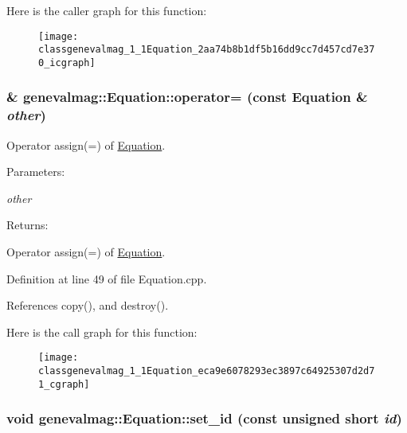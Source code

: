 Here is the caller graph for this function:\nopagebreak
\begin{figure}[H]
\begin{center}
\leavevmode
\texttt{[image: classgenevalmag\_1\_1Equation\_2aa74b8b1df5b16dd9cc7d457cd7e370\_icgraph]}
\end{center}
\end{figure}
\hypertarget{classgenevalmag_1_1Equation_eca9e6078293ec3897c64925307d2d71}{
\subsubsection[{operator=}]{ \& genevalmag::Equation::operator= (const {\bf Equation} \& {\em other})}}
\label{classgenevalmag_1_1Equation_eca9e6078293ec3897c64925307d2d71}


Operator assign(=) of \hyperlink{classgenevalmag_1_1Equation}{Equation}. \begin{Desc}
\item[Parameters:]
\begin{description}
\item[{\em other}]\end{description}
\end{Desc}
\begin{Desc}
\item[Returns:]\end{Desc}
Operator assign(=) of \hyperlink{classgenevalmag_1_1Equation}{Equation}. 

Definition at line 49 of file Equation.cpp.

References copy(), and destroy().

Here is the call graph for this function:\nopagebreak
\begin{figure}[H]
\begin{center}
\leavevmode
\texttt{[image: classgenevalmag\_1\_1Equation\_eca9e6078293ec3897c64925307d2d71\_cgraph]}
\end{center}
\end{figure}
\hypertarget{classgenevalmag_1_1Equation_651c8c1bee79e950801a2344fea7cedb}{
\subsubsection[{set\_\-id}]{\setlength{\rightskip}{0pt plus 5cm}void genevalmag::Equation::set\_\-id (const unsigned short {\em id})}}
\label{classgenevalmag_1_1Equation_651c8c1bee79e950801a2344fea7cedb}


